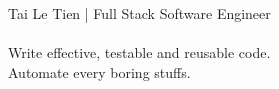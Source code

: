 {\Huge Tai Le Tien} | Full Stack Software Engineer\\
\\
Write effective, testable and reusable code.\\
Automate every boring stuffs.\\
